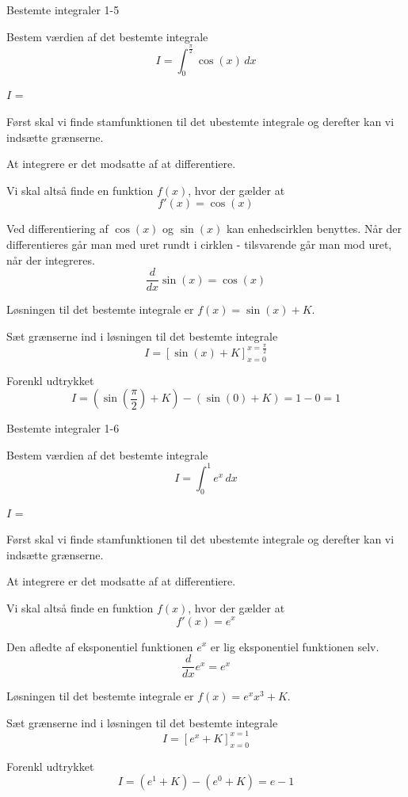 \documentclass{article}
\begin{document}
\newpage

\begin{exercise}{Bestemte integraler 1-5}

Bestem værdien af det bestemte integrale
\[
I = \int_0^{\frac{\pi}{2}} \cos(x) \, dx
\]

$I$ = 


\hint
Først skal vi finde stamfunktionen til det ubestemte integrale og derefter kan vi indsætte grænserne.

\hint
At integrere er det modsatte af at differentiere.

\hint
Vi skal altså finde en funktion $f(x)$, hvor der gælder at
\[
f'(x) = \cos(x)
\]

\hint
Ved differentiering af $\cos(x)$ og $\sin(x)$ kan enhedscirklen benyttes. Når der differentieres går man med uret rundt i cirklen - tilsvarende går man mod uret, når der integreres.
\[
\frac{d}{dx} \sin(x) = \cos(x)
\]

\hint
Løsningen til det bestemte integrale er $f(x) = \sin(x) + K$.

\hint
Sæt grænserne ind i løsningen til det bestemte integrale
\[
I = \left[ \sin(x) + K \right]_{x=0}^{x=\frac{\pi}{2}}
\]

\hint
Forenkl udtrykket
\[
I = \left( \sin\left(\frac{\pi}{2}\right) + K \right) - \left( \sin(0) + K \right) = 1 - 0 = 1
\]



\end{exercise}

\newpage

\begin{exercise}{Bestemte integraler 1-6}

Bestem værdien af det bestemte integrale
\[
I = \int_0^1 e^x \, dx
\]

$I$ = 


\hint
Først skal vi finde stamfunktionen til det ubestemte integrale og derefter kan vi indsætte grænserne.

\hint
At integrere er det modsatte af at differentiere.

\hint
Vi skal altså finde en funktion $f(x)$, hvor der gælder at
\[
f'(x) = e^x
\]

\hint
Den afledte af eksponentiel funktionen $e^x$ er lig eksponentiel funktionen selv.
\[
\frac{d}{dx} e^x= e^x
\]

\hint
Løsningen til det bestemte integrale er $f(x) = e^x x^3 + K$.

\hint
Sæt grænserne ind i løsningen til det bestemte integrale
\[
I = \left[ e^x + K \right]_{x=0}^{x=1}
\]

\hint
Forenkl udtrykket
\[
I = \left( e^1 + K \right) - \left( e^0 + K \right) = e - 1
\]


\end{exercise}
\end{document}
